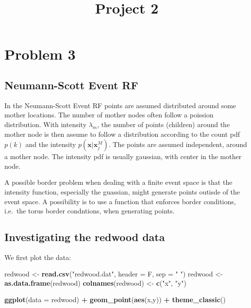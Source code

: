 \documentclass[
]{article}
\title{Project 2}
\author{}
\date{\vspace{-2.5em}}
\newenvironment{Shaded}{\begin{snugshade}}{\end{snugshade}}
\newcommand{\DataTypeTok}[1]{\textcolor[rgb]{0.13,0.29,0.53}{#1}}
\newcommand{\KeywordTok}[1]{\textcolor[rgb]{0.13,0.29,0.53}{\textbf{#1}}}
\newcommand{\NormalTok}[1]{#1}
\newcommand{\OperatorTok}[1]{\textcolor[rgb]{0.81,0.36,0.00}{\textbf{#1}}}
\newcommand{\StringTok}[1]{\textcolor[rgb]{0.31,0.60,0.02}{#1}}
\newcommand{\vect}[1]{\ensuremath{\boldsymbol{\mathbf{#1}}}}
\begin{document}
\maketitle

\hypertarget{problem-3}{%
\section{Problem 3}\label{problem-3}}

\hypertarget{neumann-scott-event-rf}{%
\subsection{Neumann-Scott Event RF}\label{neumann-scott-event-rf}}

In the Neumann-Scott Event RF points are assumed distributed around some
mother locations. The number of mother nodes often follow a poission
distribution. With intensity \(\lambda_m\), the number of points
(children) around the mother node is then assume to follow a
distribution according to the count pdf \(p(k)\) and the intensity
\(p(\vect x| \vect x_j^M)\). The points are assumed independent, around
a mother node. The intensity pdf is usually gaussian, with center in the
mother node.

A possible border problem when dealing with a finite event space is that
the intensity function, especially the guassian, might generate points
outisde of the event space. A possibility is to use a function that
enforces border conditions, i.e.~the torus border condntions, when
generating points.

\hypertarget{investigating-the-redwood-data}{%
\subsection{Investigating the redwood
data}\label{investigating-the-redwood-data}}

We first plot the data:

\begin{Shaded}
\begin{Highlighting}[]
\NormalTok{redwood <-}\StringTok{ }\KeywordTok{read.csv}\NormalTok{(}\StringTok{"redwood.dat"}\NormalTok{, }\DataTypeTok{header =}\NormalTok{ F, }\DataTypeTok{sep =} \StringTok{" "}\NormalTok{)}
\NormalTok{redwood <-}\StringTok{ }\KeywordTok{as.data.frame}\NormalTok{(redwood)}
\KeywordTok{colnames}\NormalTok{(redwood) <-}\StringTok{ }\KeywordTok{c}\NormalTok{(}\StringTok{"x"}\NormalTok{, }\StringTok{"y"}\NormalTok{)}

\KeywordTok{ggplot}\NormalTok{(}\DataTypeTok{data =}\NormalTok{ redwood) }\OperatorTok{+}\StringTok{ }\KeywordTok{geom_point}\NormalTok{(}\KeywordTok{aes}\NormalTok{(x,y)) }\OperatorTok{+}\StringTok{ }\KeywordTok{theme_classic}\NormalTok{()}
\end{Highlighting}
\end{Shaded}
\end{document}
